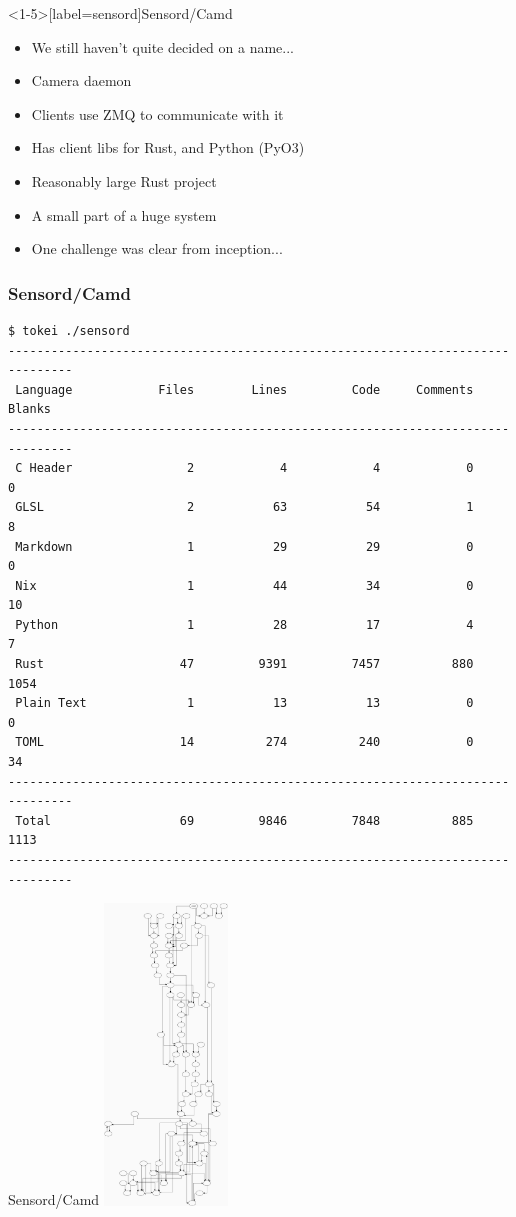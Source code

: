 \documentclass[aspectratio=43]{beamer}
\begin{document}
\begin{frame}<1-5>[label=sensord]{Sensord/Camd}
    \begin{itemize}
        \item<1-> We still haven't quite decided on a name...
        \item<2-> Camera daemon
        \item<3-> Clients use ZMQ to communicate with it
        \item<4-> Has client libs for Rust, and Python (PyO3)
        \item<5-> Reasonably large Rust project
        \item<6-> A small part of a huge system
        \item<7-> One challenge was clear from inception...
    \end{itemize}
\end{frame}
\begin{frame}[fragile]
    \frametitle{Sensord/Camd}
    \centering
    \begin{verbatim}
$ tokei ./sensord
-------------------------------------------------------------------------------
 Language            Files        Lines         Code     Comments       Blanks
-------------------------------------------------------------------------------
 C Header                2            4            4            0            0
 GLSL                    2           63           54            1            8
 Markdown                1           29           29            0            0
 Nix                     1           44           34            0           10
 Python                  1           28           17            4            7
 Rust                   47         9391         7457          880         1054
 Plain Text              1           13           13            0            0
 TOML                   14          274          240            0           34
-------------------------------------------------------------------------------
 Total                  69         9846         7848          885         1113
-------------------------------------------------------------------------------
    \end{verbatim}
\end{frame}
\begin{frame}{Sensord/Camd}
    \centering
    \includegraphics[height=8cm]{./imgs/camd-huge.jpg}
\end{frame}
\end{document}
